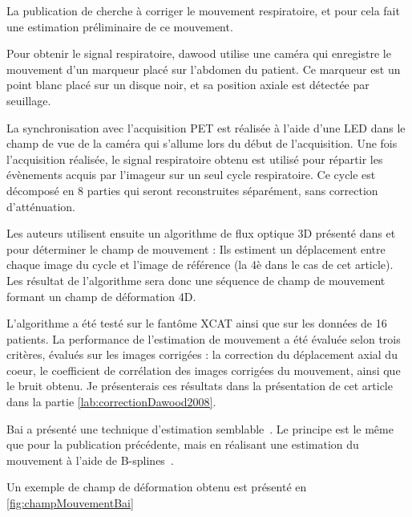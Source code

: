 La publication de \cite{dawood2008respiratory} cherche à corriger le mouvement respiratoire, et pour cela fait une estimation préliminaire de ce mouvement. 

Pour obtenir le signal respiratoire, dawood utilise une caméra qui enregistre le mouvement d'un marqueur placé sur l'abdomen du patient. Ce marqueur est un point blanc placé sur un disque noir, et sa position axiale est détectée par seuillage. 

La synchronisation avec l'acquisition PET est réalisée à l'aide d'une LED dans le champ de vue de la caméra qui s'allume lors du début de l'acquisition. Une fois l'acquisition réalisée, le signal respiratoire obtenu est utilisé pour répartir les évènements acquis par l'imageur sur un seul cycle respiratoire. Ce cycle est décomposé en 8 parties qui seront reconstruites séparément, sans correction d'atténuation. 

Les auteurs utilisent ensuite un algorithme de flux optique 3D présenté dans \cite{dawood2006lung} et \cite{horn1981determining} pour déterminer le champ de mouvement : Ils estiment un déplacement entre chaque image du cycle et l'image de référence (la 4è dans le cas de cet article). Les résultat de l'algorithme sera donc une séquence de champ de mouvement formant un champ de déformation 4D.

L'algorithme a été testé sur le fantôme XCAT ainsi que sur les données de 16 patients. La performance de l'estimation de mouvement a été évaluée selon trois critères, évalués sur les images corrigées : la correction du déplacement axial du coeur, le coefficient de corrélation des images corrigées du mouvement, ainsi que le bruit obtenu. Je présenterais ces résultats dans la présentation de cet article dans la partie \ref{lab:correctionDawood2008}.

Bai a présenté une technique d'estimation semblable~\cite{bai2009regularized}. Le principe est le même que pour la publication précédente, mais en réalisant une estimation du mouvement à l'aide de B-splines~\cite{thevenaz2000optimization}.

Un exemple de champ de déformation obtenu est présenté en \ref{fig:champMouvementBai}

